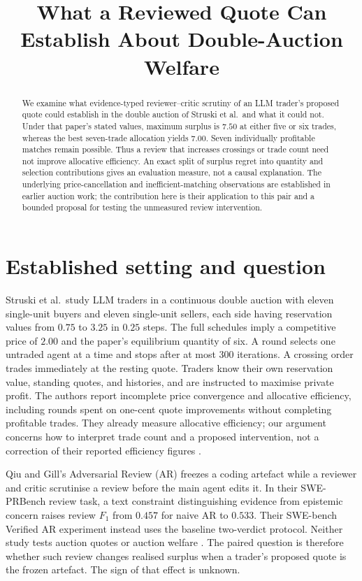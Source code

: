 \documentclass{article}
\title{What a Reviewed Quote Can Establish About Double-Auction Welfare}
\begin{document}
\maketitle

\begin{abstract}
We examine what evidence-typed reviewer--critic scrutiny of an LLM trader's proposed quote could establish
in the double auction of Struski et al.\ and what it could not. Under that paper's stated values, maximum
surplus is \(7.50\) at either five or six trades, whereas the best seven-trade allocation yields \(7.00\).
Seven individually profitable matches remain possible. Thus a review that increases crossings or trade
count need not improve allocative efficiency. An exact split of surplus regret into quantity and selection
contributions gives an evaluation measure, not a causal explanation. The underlying price-cancellation and
inefficient-matching observations are established in earlier auction work; the contribution here is their
application to this pair and a bounded proposal for testing the unmeasured review intervention.
\end{abstract}

\section{Established setting and question}

Struski et al.\ study LLM traders in a continuous double auction with eleven single-unit buyers and eleven
single-unit sellers, each side having reservation values from \(0.75\) to \(3.25\) in \(0.25\) steps. The
full schedules imply a competitive price of \(2.00\) and the paper's equilibrium quantity of six. A round
selects one untraded agent at a time and stops after at most 300 iterations. A crossing order trades
immediately at the resting quote. Traders know their own reservation value, standing quotes, and
histories, and are instructed to maximise private profit. The authors report incomplete price convergence
and allocative efficiency, including rounds spent on one-cent quote improvements without completing
profitable trades. They already measure allocative efficiency; our argument concerns how to interpret
trade count and a proposed intervention, not a correction of their reported efficiency figures
\cite{struski2026}.

Qiu and Gill's Adversarial Review (AR) freezes a coding artefact while a reviewer and critic scrutinise a
review before the main agent edits it. In their SWE-PRBench review task, a text constraint distinguishing
evidence from epistemic concern raises review \(F_1\) from \(0.457\) for naive AR to \(0.533\). Their
SWE-bench Verified AR experiment instead uses the baseline two-verdict protocol. Neither study tests
auction quotes or auction welfare \cite{qiu2026}. The paired question is therefore whether such review
changes realised surplus when a trader's proposed quote is the frozen artefact. The sign of that effect is
unknown.
\end{document}
